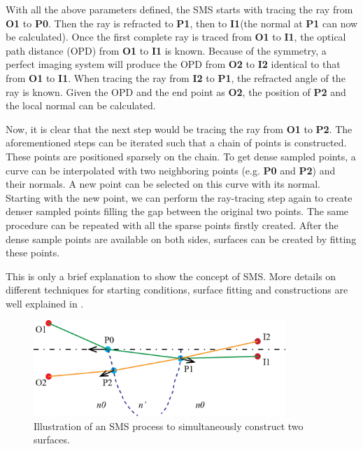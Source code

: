 With all the above parameters defined, the SMS starts with tracing the ray from \textbf{O1} to \textbf{P0}. Then the ray is refracted to \textbf{P1}, then to \textbf{I1}(the normal at \textbf{P1} can now be calculated). Once the first complete ray is traced from \textbf{O1} to \textbf{I1}, the optical path distance (OPD) from \textbf{O1} to \textbf{I1} is known. Because of the symmetry, a perfect imaging system will produce the OPD from \textbf{O2} to \textbf{I2} identical to that from \textbf{O1} to \textbf{I1}. When tracing the ray from \textbf{I2} to \textbf{P1}, the refracted angle of the ray is known. Given the OPD and the end point as \textbf{O2}, the position of \textbf{P2} and the local normal can be calculated. 

Now, it is clear that the next step would be tracing the ray from \textbf{O1} to \textbf{P2}. The aforementioned steps can be iterated such that a chain of points is constructed. These points are positioned sparsely on the chain. To get dense sampled points, a curve can be interpolated with two neighboring points (e.g.  \textbf{P0} and \textbf{P2}) and their normals. A new point can be selected on this curve with its normal. Starting with the new point, we can perform the ray-tracing step again to create denser sampled points filling the gap between the original two points. The same procedure can be repeated with all the sparse points firstly created. After the dense sample points are available on both sides, surfaces can be created by fitting these points. 

This is only a brief explanation to show the concept of SMS. More details on different techniques for starting conditions, surface fitting and constructions are well explained in \cite{book:ChavesNonimagingOptics}.

\begin{figure}[h!]
    \centering
    \includegraphics[width=0.85\textwidth]{chapter-5/figures/Figure_sms_explain_2D.png}
    \caption{Illustration of an SMS process to simultaneously construct two surfaces.}
    \label{fig: sms_2d_explain}
\end{figure}

